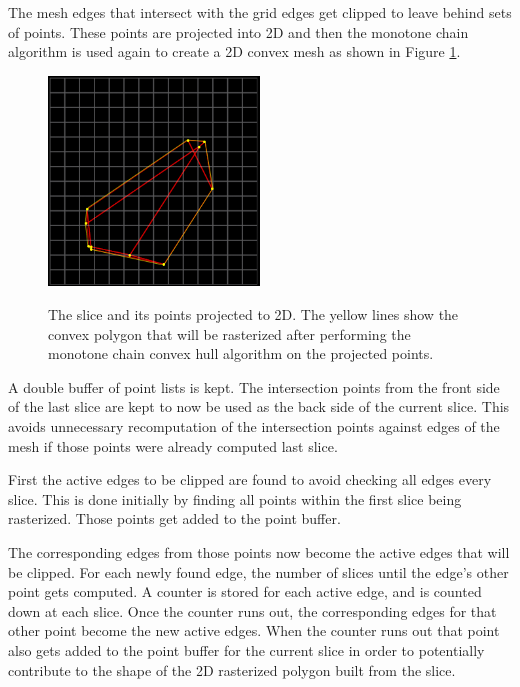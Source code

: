 \documentclass[12pt]{ucthesis}
\newcommand{\captionfonts}{\small\bf\ssp}
\begin{document}
The mesh edges that intersect with the grid edges get clipped to leave behind sets of points.
These points are projected into 2D and then the monotone chain algorithm is used again to create a 2D convex mesh as shown in Figure \ref{fig:projected-slice}.

\begin{figure}
\begin{center}
\includegraphics[width=0.5\textwidth]{Images/RasterizingAlgorithm/Final/SliceOrtho.png}
\captionfonts
\caption[Mesh Edge List Slice 2D View]{The slice and its points projected to 2D.  The yellow lines show the convex polygon that will be rasterized after performing the monotone chain convex hull algorithm on the projected points.}
\label{fig:projected-slice}
\end{center}
\end{figure}

A double buffer of point lists is kept.
The intersection points from the front side of the last slice are kept to now be used as the back side of the current slice.
This avoids unnecessary recomputation of the intersection points against edges of the mesh if those points were already computed last slice.

First the active edges to be clipped are found to avoid checking all edges every slice.
This is done initially by finding all points within the first slice being rasterized.
Those points get added to the point buffer.

The corresponding edges from those points now become the active edges that will be clipped.
For each newly found edge, the number of slices until the edge's other point gets computed.
A counter is stored for each active edge, and is counted down at each slice.
Once the counter runs out, the corresponding edges for that other point become the new active edges.
When the counter runs out that point also gets added to the point buffer for the current slice in order to potentially contribute to the shape of the 2D rasterized polygon built from the slice.
\end{document}
